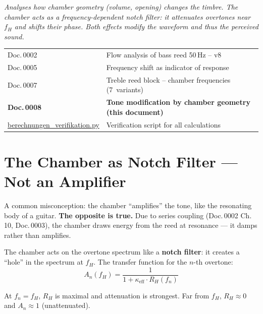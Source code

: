 \documentclass[11pt,a4paper]{article}
\begin{document}
\hbmaketitle

{\small\itshape Analyses how chamber geometry (volume, opening) changes the timbre. The chamber acts as a frequency-dependent notch filter: it attenuates overtones near $f_H$ and shifts their phase. Both effects modify the waveform and thus the perceived sound.}

\vspace{2mm}
\begin{center}\small
\begin{tabularx}{\textwidth}{l X}
\hbtoprule
Doc.\,0002 & Flow analysis of bass reed 50\,Hz -- v8 \\
Doc.\,0005 & Frequency shift as indicator of response \\
Doc.\,0007 & Treble reed block -- chamber frequencies (7~variants) \\
\textbf{Doc.\,0008} & \textbf{Tone modification by chamber geometry (this document)} \\
\midrule
\href{berechnungen_verifikation.py}{berechnungen\_verifikation.py} & Verification script for all calculations \\
\bottomrule
\end{tabularx}
\end{center}
\vspace{4mm}


\section{The Chamber as Notch Filter --- Not an Amplifier}

A common misconception: the chamber ``amplifies'' the tone, like the resonating body of a guitar. \textbf{The opposite is true.} Due to series coupling (Doc.\,0002 Ch.\,10, Doc.\,0003), the chamber draws energy from the reed at resonance --- it damps rather than amplifies.

The chamber acts on the overtone spectrum like a \textbf{notch filter}: it creates a ``hole'' in the spectrum at $f_H$. The transfer function for the $n$-th overtone:
\begin{equation}
A_n(f_H) = \frac{1}{1 + \kappa_\text{eff} \cdot R_H(f_n)}
\end{equation}

At $f_n = f_H$, $R_H$ is maximal and attenuation is strongest. Far from $f_H$, $R_H \approx 0$ and $A_n \approx 1$ (unattenuated).
\end{document}
